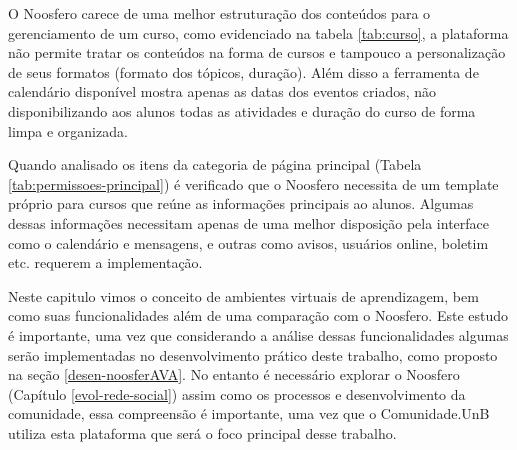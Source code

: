 O Noosfero carece de uma melhor estruturação dos conteúdos para o gerenciamento de um curso, como evidenciado na tabela \ref{tab:curso}, a plataforma não permite tratar os conteúdos na forma de cursos e tampouco a personalização de seus formatos (formato dos tópicos, duração). Além disso a ferramenta de calendário disponível mostra apenas as datas dos eventos criados, não disponibilizando aos alunos todas as atividades e duração do curso de forma limpa e organizada.

Quando analisado os itens da categoria de página principal (Tabela \ref{tab:permissoes-principal}) é verificado que o Noosfero necessita de um template próprio para cursos que reúne as informações principais ao alunos. Algumas dessas informações necessitam apenas de uma melhor disposição pela interface como o calendário e mensagens, e outras como avisos, usuários online, boletim etc. requerem a implementação.

Neste capitulo vimos o conceito de ambientes virtuais de aprendizagem, bem como suas funcionalidades além de uma comparação com o Noosfero. Este estudo é importante, uma vez que considerando a análise dessas funcionalidades algumas serão implementadas no desenvolvimento prático deste trabalho, como proposto na seção \ref{desen-noosferAVA}. No entanto é necessário explorar o Noosfero (Capítulo \ref{evol-rede-social}) assim como os processos e desenvolvimento da comunidade, essa compreensão é importante, uma vez que o Comunidade.UnB utiliza esta plataforma que será o foco principal desse trabalho.